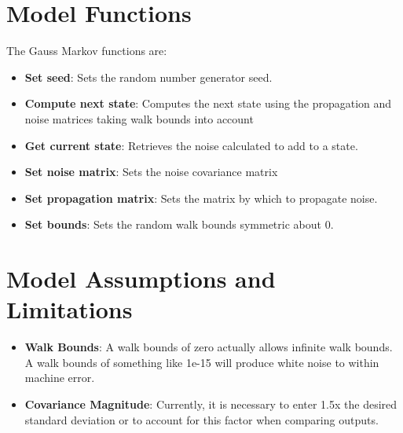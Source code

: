 \section{Model Functions}
The Gauss Markov functions are:
\begin{itemize}
	\item \textbf{Set seed}: Sets the random number generator seed.
	\item \textbf{Compute next state}: Computes the next state using the propagation and noise matrices taking walk bounds into account
	\item \textbf{Get current state}: Retrieves the noise calculated to add to a state.
	\item \textbf{Set noise matrix}: Sets the noise covariance matrix
	\item \textbf{Set propagation matrix}: Sets the matrix by which to propagate noise.
	\item \textbf{Set bounds}: Sets the random walk bounds symmetric about 0.
\end{itemize}


\section{Model Assumptions and Limitations}
\begin{itemize}
	\item \textbf{Walk Bounds}: A walk bounds of zero actually allows infinite walk bounds. A walk bounds of something like 1e-15 will produce white noise to within machine error.
	\item \textbf{Covariance Magnitude}: Currently, it is necessary to enter 1.5x the desired standard deviation or to account for this factor when comparing outputs.
\end{itemize}